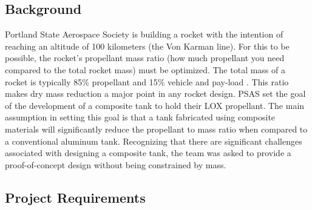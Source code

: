 

\subsection{Background}

Portland State Aerospace Society is building a rocket with the intention of reaching an altitude of 100 kilometers (the Von Karman line). For this to be possible, the rocket’s propellant mass ratio (how much propellant you need compared to the total rocket mass) must be optimized. The total mass of a rocket is typically  85\% propellant and 15\% vehicle and pay-load \cite{Pettit2012}. This ratio makes dry mass reduction a major point in any rocket design. PSAS set the goal of the development of a composite tank to hold their LOX propellant. The main assumption in setting this goal is that a tank fabricated using composite materials will significantly reduce the propellant to mass ratio when compared to a conventional aluminum tank. Recognizing that there are significant challenges associated with designing a composite tank, the team was asked to provide a proof-of-concept design without being constrained by mass.

\subsection{Project Requirements}
\vspace{1em}
